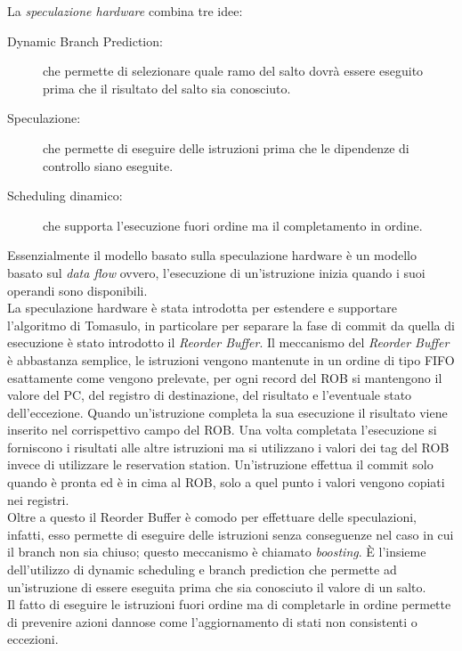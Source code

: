 La \emph{speculazione hardware} combina tre idee:
\begin{description}
\item[Dynamic Branch Prediction:] che permette di selezionare quale ramo del salto dovrà essere eseguito prima che il risultato del salto sia conosciuto.
\item[Speculazione:] che permette di eseguire delle istruzioni prima che le dipendenze di controllo siano eseguite.
\item[Scheduling dinamico:] che supporta l'esecuzione fuori ordine ma il completamento in ordine.
\end{description}
Essenzialmente il modello basato sulla speculazione hardware è un modello basato sul \emph{data flow} ovvero, l'esecuzione di un'istruzione inizia quando i suoi operandi sono disponibili.\\
La speculazione hardware è stata introdotta per estendere e supportare l'algoritmo di Tomasulo, in particolare per separare la fase di commit da quella di esecuzione è stato introdotto il \emph{Reorder Buffer}. 
Il meccanismo del \emph{Reorder Buffer} è abbastanza semplice, le istruzioni vengono mantenute in un ordine di tipo FIFO esattamente come vengono prelevate, per ogni record del ROB si mantengono il valore del PC, del registro di destinazione, del risultato e l'eventuale stato dell'eccezione. Quando un'istruzione completa la sua esecuzione il risultato viene inserito nel corrispettivo campo del ROB. Una volta completata l'esecuzione si forniscono i risultati alle altre istruzioni ma si utilizzano i valori dei tag del ROB invece di utilizzare le reservation station. Un'istruzione effettua il commit solo quando è pronta ed è in cima al ROB, solo a quel punto i valori vengono copiati nei registri.\\
Oltre a questo il Reorder Buffer è comodo per effettuare delle speculazioni, infatti, esso permette di eseguire delle istruzioni senza conseguenze nel caso in cui il branch non sia chiuso; questo meccanismo è chiamato \emph{boosting}. \uppercase{è} l'insieme dell'utilizzo di dynamic scheduling e branch prediction che permette ad un'istruzione di essere eseguita prima che sia conosciuto il valore di un salto.\\
Il fatto di eseguire le istruzioni fuori ordine ma di completarle in ordine permette di prevenire azioni dannose come l'aggiornamento di stati non consistenti o eccezioni.

